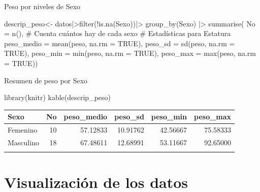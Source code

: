 \documentclass[
  ignorenonframetext,
  aspectratio=169,
  spanish,
]{beamer}
\newenvironment{Shaded}{\begin{snugshade}}{\end{snugshade}}
\newcommand{\AttributeTok}[1]{\textcolor[rgb]{0.40,0.45,0.13}{#1}}
\newcommand{\CommentTok}[1]{\textcolor[rgb]{0.37,0.37,0.37}{#1}}
\newcommand{\ConstantTok}[1]{\textcolor[rgb]{0.56,0.35,0.01}{#1}}
\newcommand{\FunctionTok}[1]{\textcolor[rgb]{0.28,0.35,0.67}{#1}}
\newcommand{\NormalTok}[1]{\textcolor[rgb]{0.00,0.23,0.31}{#1}}
\newcommand{\OtherTok}[1]{\textcolor[rgb]{0.00,0.23,0.31}{#1}}
\newcommand{\SpecialCharTok}[1]{\textcolor[rgb]{0.37,0.37,0.37}{#1}}
\begin{document}
\begin{frame}[fragile]{Peso por niveles de Sexo}
\label{peso-por-niveles-de-sexo}
\begin{Shaded}
\begin{Highlighting}[]
\NormalTok{descrip\_peso}\OtherTok{\textless{}{-}}\NormalTok{ datos}\SpecialCharTok{|\textgreater{}}\FunctionTok{filter}\NormalTok{(}\SpecialCharTok{!}\FunctionTok{is.na}\NormalTok{(Sexo))}\SpecialCharTok{|\textgreater{}}
  \FunctionTok{group\_by}\NormalTok{(Sexo) }\SpecialCharTok{|\textgreater{}} 
  \FunctionTok{summarise}\NormalTok{(}
    \AttributeTok{No =} \FunctionTok{n}\NormalTok{(), }\CommentTok{\# Cuenta cuántos hay de cada sexo}
    \CommentTok{\# Estadísticas para Estatura}
    \AttributeTok{peso\_medio =} \FunctionTok{mean}\NormalTok{(peso, }\AttributeTok{na.rm =} \ConstantTok{TRUE}\NormalTok{),}
    \AttributeTok{peso\_sd =} \FunctionTok{sd}\NormalTok{(peso, }\AttributeTok{na.rm =} \ConstantTok{TRUE}\NormalTok{),}
    \AttributeTok{peso\_min =} \FunctionTok{min}\NormalTok{(peso, }\AttributeTok{na.rm =} \ConstantTok{TRUE}\NormalTok{),}
    \AttributeTok{peso\_max =} \FunctionTok{max}\NormalTok{(peso, }\AttributeTok{na.rm =} \ConstantTok{TRUE}\NormalTok{))}
\end{Highlighting}
\end{Shaded}
\end{frame}

\begin{frame}[fragile]{Resumen de peso por Sexo}
\label{resumen-de-peso-por-sexo}
\begin{Shaded}
\begin{Highlighting}[]
\FunctionTok{library}\NormalTok{(knitr)}
\FunctionTok{kable}\NormalTok{(descrip\_peso)}
\end{Highlighting}
\end{Shaded}

\begin{longtable}[]{@{}lrrrrr@{}}
\toprule\noalign{}
Sexo & No & peso\_medio & peso\_sd & peso\_min & peso\_max \\
\midrule\noalign{}
\endhead
Femenino & 10 & 57.12833 & 10.91762 & 42.56667 & 75.58333 \\
Masculino & 18 & 67.48611 & 12.68991 & 53.11667 & 92.65000 \\
\bottomrule\noalign{}
\end{longtable}
\end{frame}

\section{Visualización de los
datos}\label{visualizaciuxf3n-de-los-datos}
\end{document}

